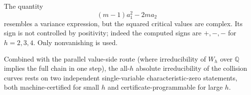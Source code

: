 \begin{remark}\label{rem:complex-variance}
The quantity
\[
(m-1)a_1^2-2m a_2
\]
resembles a variance expression, but the squared critical values are complex. Its sign is not controlled by positivity; indeed the computed signs are $+,-,-$ for $h=2,3,4$. Only nonvanishing is used.
\end{remark}

Combined with the parallel value-side route (where irreducibility of $W_h$ over $\mathbb Q$ implies the full chain in one step), the all-$h$ absolute irreducibility of the collision curves rests on two independent single-variable characteristic-zero statements, both machine-certified for small $h$ and certificate-programmable for large $h$.
